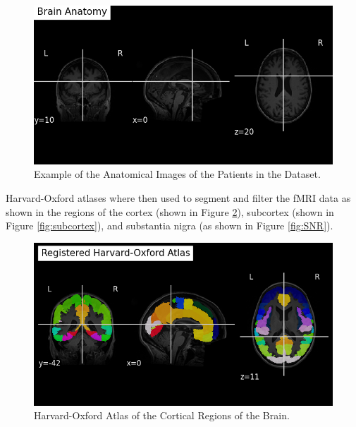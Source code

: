 \documentclass[12pt]{article}
\begin{document}
\begin{figure}[h]  %
    \centering
    \includegraphics[width=\textwidth]{"../img/anatomy.png"}  %
    \caption{Example of the Anatomical Images of the Patients in the Dataset.}
    \label{fig:anatomy}  %
\end{figure}

\FloatBarrier  %

Harvard-Oxford atlases where then used to segment and filter the fMRI data as shown in the regions of the cortex (shown in Figure \ref{fig:cortex}), subcortex (shown in Figure \ref{fig:subcortex}), and substantia nigra (as shown in Figure \ref{fig:SNR}). 

\begin{figure}[h]  %
    \centering
    \includegraphics[width=\textwidth]{"../img/cortex.png"}  %
    \caption{Harvard-Oxford Atlas of the Cortical Regions of the Brain.}
    \label{fig:cortex}  %
\end{figure}
\end{document}
